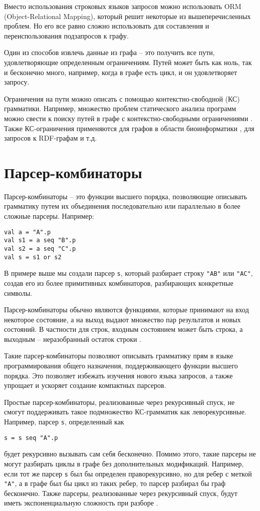 Вместо использования строковых языков запросов можно использовать ORM (Object-Relational Mapping), который решит некоторые из вышеперечисленных проблем. Но его все равно сложно использовать для составления и переиспользования подзапросов к графу.

Один из способов извлечь данные из графа -- это получить все пути, удовлетворяющие определенным ограничениям.
Путей может быть как ноль, так и бесконечно много, например, когда в графе есть цикл, и он удовлетворяет запросу.

Ограничения на пути можно описать с помощью контекстно-свободной (КС) грамматики.
Например, множество проблем статического анализа программ можно свести к поиску путей в графе с контекстно-свободными ограничениями \cite{RepsProgramAnalysis}.
Также КС-ограничения применяются для графов в области биоинформатики \cite{BioinformaticsCF}, для запросов к RDF-графам \cite{RDF_CF} и т.д.


\section{Парсер-комбинаторы}

Парсер-комбинаторы -- это функции высшего порядка, позволяющие описывать грамматику путем их объединения последовательно или параллельно в более сложные парсеры. Например:
\begin{lstlisting}
val a = "A".p
val s1 = a seq "B".p
val s2 = a seq "C".p
val s = s1 or s2
\end{lstlisting}
В примере выше мы создали парсер \verb|s|, который разбирает строку \verb|"AB"| или \verb|"AС"|, создав его из более примитивных комбинаторов, разбирающих конкретные символы.

Парсер-комбинаторы обычно являются функциями, которые принимают на вход некоторое состояние, а на выход выдают множество пар результатов и новых состояний. В частности для строк, входным состоянием может быть строка, а выходным -- неразобранный остаток строки \cite{Hutton_1992}.

Такие парсер-комбинаторы позволяют описывать грамматику прям в языке программирования общего назначения, поддерживающего функции высшего порядка. Это позволяет избежать изучения нового языка запросов, а также упрощает и ускоряет создание компактных парсеров.

Простые парсер-комбинаторы, реализованные через рекурсивный спуск, не смогут поддерживать такое подмножество КС-грамматик как леворекурсивные.
Например, парсер \verb|s|, определенный как
\begin{lstlisting}[numbers=none, frame=none, xleftmargin=0pt]
s = s seq "A".p
\end{lstlisting}
будет рекурсивно вызывать сам себя бесконечно.
Помимо этого, такие парсеры не могут разбирать циклы в графе без дополнительных модификаций. Например, если тот же парсер \verb|s| был бы определен праворекурсивно, но для ребер с меткой \verb|"A"|, а в графе был бы цикл из таких ребер, то парсер разбирал бы граф бесконечно.
Также парсеры, реализованные через рекурсивный спуск, будут иметь экспоненциальную сложность при разборе \cite{Meerkat}.


